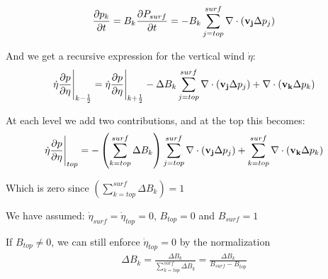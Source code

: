 \begin{eqnarray} \nonumber
\frac{\partial p_{k}}{\partial t}=B_k\frac{\partial P_{surf}}{\partial t}=-B_k\sum_{j=top}^{surf} \nabla \cdot \left({\bf v_j} \Delta p_j\right)
\end{eqnarray}

And we get a recursive expression for the vertical wind $\dot \eta$:
\begin{eqnarray} \nonumber
\dot \eta \frac{\partial p}{\partial \eta}{\Bigg \vert_{k-\frac{1}{2}}} = \dot \eta \frac{\partial p}{\partial \eta}{\Bigg \vert_{k+\frac{1}{2}}} -\Delta B_k\sum_{j=top}^{surf} \nabla \cdot \left({\bf v_j} \Delta p_j\right) + \nabla \cdot \left({\bf v_k} \Delta p_k\right)
\end{eqnarray}

At each level we add two contributions, and at the top this becomes:
\begin{eqnarray} \nonumber
\dot \eta \frac{\partial p}{\partial \eta}{\Bigg \vert_{top}} = -\left(\sum_{k=top}^{surf}\Delta B_k \right)\sum_{j=top}^{surf} \nabla \cdot \left({\bf v_j} \Delta p_j\right) + \sum_{k=top}^{surf} \nabla \cdot \left({\bf v_k} \Delta p_k\right)
\end{eqnarray}

Which is zero since $\left(\sum_{k=top}^{surf}\Delta B_k \right)=1$

We have assumed:
$\dot \eta_{surf}= \dot \eta_{top}=0$, $B_{top}=0$ and $ B_{surf}=1$

If $B_{top}\neq 0$, we can still enforce $\dot\eta_{top}=0$ by the normalization
\begin{eqnarray} \nonumber
\Delta B_k=\frac{\Delta B_k}{\sum_{k=top}^{surf}\Delta B_k}=\frac{\Delta B_k}{B_{surf}-B_{top}}
\end{eqnarray}




